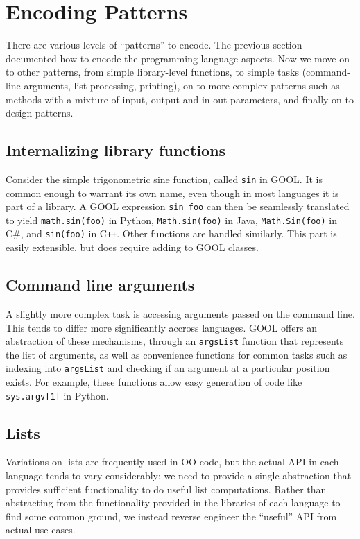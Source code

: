 \documentclass[sigplan,review,anonymous,prologue,dvipsnames]{acmart}
\newcommand{\Csharp}{C\#}
\newcommand{\Cplusplus}{C\texttt{++}}
\begin{document}
\section{Encoding Patterns} \label{sec:patterns}

There are various levels of ``patterns'' to encode. The previous section
documented how to encode the programming language aspects. Now we
move on to other patterns, from simple library-level functions, to
simple tasks (command-line arguments, list processing, printing), on to
more complex patterns such as methods with a mixture of input, output
and in-out parameters, and finally on to design patterns.

\subsection{Internalizing library functions}

Consider the simple trigonometric sine function, called \verb|sin| in
GOOL. It is common enough to warrant its own name, even though in most
languages it is part of a library.  A GOOL expression \verb|sin foo|
can then be seamlessly translated to 
yield \verb|math.sin(foo)| in Python, \verb|Math.sin(foo)| in Java,
\verb|Math.Sin(foo)| in \Csharp, and \verb|sin(foo)| in \Cplusplus. Other
functions are handled similarly.  This part is easily extensible, but does
require adding to GOOL classes.

\subsection{Command line arguments}

A slightly more complex task is accessing arguments passed on the command
line. This tends to differ more significantly accross languages. GOOL
offers an abstraction of these mechanisms, through an \verb|argsList| function
that represents the list of arguments, as well as convenience functions for
common tasks such as indexing into \verb|argsList| and checking if an argument
at a particular position exists. For example, these functions allow easy 
generation of code like \verb|sys.argv[1]| in Python. 

\subsection{Lists}

Variations on lists are frequently used in OO code, but the actual API
in each language tends to vary considerably; we need to provide a single
abstraction that provides sufficient functionality to do useful list
computations.  Rather than abstracting from the functionality provided
in the libraries of each language to find some common ground, we instead
reverse engineer the ``useful'' API from actual use cases.  
\end{document}
